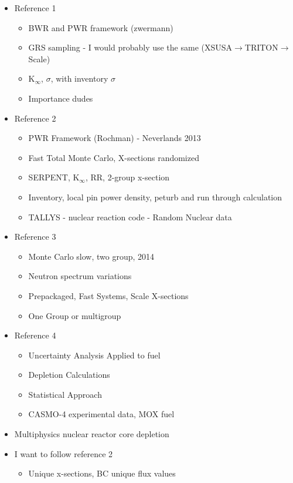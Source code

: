 \documentclass[idxtotoc,hyperref,openany,oneside]{labbook} %
\begin{document}
\begin{itemize}
\item{Reference 1}
  \begin{itemize}
  \item{BWR and PWR framework (zwermann)}
  \item{GRS sampling - I would probably use the same (XSUSA$\rightarrow$TRITON$\rightarrow$Scale)}
  \item{K$_\infty$, $\sigma$, with inventory $\sigma$}
  \item{Importance dudes}
  \end{itemize}
\item{Reference 2}
  \begin{itemize}
  \item{PWR Framework (Rochman) - Neverlands 2013}
  \item{Fast Total Monte Carlo, X-sections randomized}
  \item{SERPENT, K$_\infty$, RR, 2-group x-section}
  \item{Inventory, local pin power density, peturb and run through calculation}
  \item{TALLYS - nuclear reaction code - Random Nuclear data}
  \end{itemize}
\item{Reference 3}
  \begin{itemize}
  \item{Monte Carlo slow, two group, 2014}
  \item{Neutron spectrum variations}
  \item{Prepackaged, Fast Systems, Scale X-sections}
  \item{One Group or multigroup}
  \end{itemize}
\item{Reference 4}
  \begin{itemize}
  \item{Uncertainty Analysis Applied to fuel}
  \item{Depletion Calculations}
  \item{Statistical Approach}
  \item{CASMO-4 experimental data, MOX fuel}
  \end{itemize}
\item{Multiphysics nuclear reactor core depletion}
\item{I want to follow reference 2}
  \begin{itemize}
  \item{Unique x-sections, BC unique flux values}
  \end{itemize}
\end{itemize}
\end{document}
